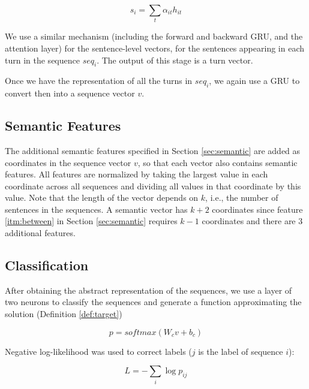 \begin{equation*}
	s_i = \sum_{t} \alpha_{it} h_{it}
\end{equation*}

We use a similar mechanism (including the forward and backward 
GRU, and the attention layer) for the sentence-level vectors, 
for the sentences appearing in each turn in the sequence $seq_i$. 
The output of this stage is a turn vector. 

Once we have the representation of all the turns in $seq_i$, 
we again use a GRU to convert then into a sequence vector $v$. 

\subsection{Semantic Features}
The additional semantic features specified in Section \ref{sec:semantic} 
are added as coordinates in the sequence vector $v$, so that 
each vector also contains semantic features. 
All features are normalized by taking the largest 
value in each coordinate across all sequences and dividing 
all values in that coordinate by this value.  
Note that the length of the vector depends on $k$, 
i.e., the number of sentences in the sequences. 
A semantic vector has $k+2$ coordinates since feature \ref{itm:between} in Section \ref{sec:semantic} requires $k-1$ coordinates 
and there are $3$ additional features. 

\subsection{Classification}
After obtaining the abstract representation of the sequences, 
we use a layer of two neurons to classify the sequences and 
generate a function approximating the solution (Definition \ref{def:target}) 

\begin{equation*}
	p = softmax(W_c v + b_c)
\end{equation*}

Negative log-likelihood was used to correct labels ($j$ is the label of sequence $i$): 

\begin{equation*}
	L = - \sum_{i} \log{p_{ij}}
\end{equation*}

